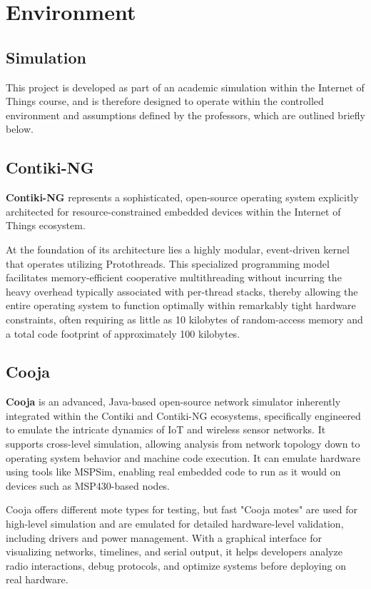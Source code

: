 \chapter{Environment}
\section{Simulation}
This project is developed as part of an academic simulation within the Internet of Things course, and is therefore designed to operate within the controlled environment and assumptions defined by the professors, which are outlined briefly below. 

\section{Contiki-NG}
\textbf{Contiki-NG} \cite{contiki_ng} represents a sophisticated, open-source operating system explicitly architected for resource-constrained embedded devices within the Internet of Things ecosystem. 

At the foundation of its architecture lies a highly modular, event-driven kernel that operates utilizing Protothreads. This specialized programming model facilitates memory-efficient cooperative multithreading without incurring the heavy overhead typically associated with per-thread stacks, thereby allowing the entire operating system to function optimally within remarkably tight hardware constraints, often requiring as little as 10 kilobytes of random-access memory and a total code footprint of approximately 100 kilobytes.

\section{Cooja}
\textbf{Cooja} is an advanced, Java-based open-source network simulator inherently integrated within the Contiki and Contiki-NG ecosystems, specifically engineered to emulate the intricate dynamics of IoT and wireless sensor networks. It supports cross-level simulation, allowing analysis from network topology down to operating system behavior and machine code execution. It can emulate hardware using tools like MSPSim, enabling real embedded code to run as it would on devices such as MSP430-based nodes.

Cooja offers different mote types for testing, but fast "Cooja motes" are used for high-level simulation and are emulated for detailed hardware-level validation, including drivers and power management. With a graphical interface for visualizing networks, timelines, and serial output, it helps developers analyze radio interactions, debug protocols, and optimize systems before deploying on real hardware.

